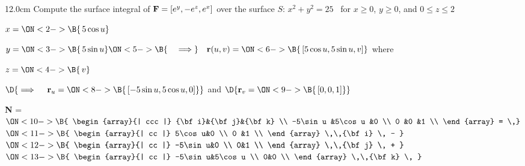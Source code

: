\begin{frame}
\begin{columns}\begin{column}{12.0cm}
\scriptsize
\EX Compute the surface integral of ${\bf F} = [e^y, -e^z, e^x]$ over the surface $S:\, x^2 + y^2 = 25$ \, for $x \ge 0$, $y \ge 0$, and $0 \le z \le 2$

\vspace{0.2cm}

\quad $
x =
\ON<2->{\B{\,5 \cos u}}$

\quad $
y =
\ON<3->{\B{\,5 \sin u}}
\ON<5->{\B{\quad \implies}} \quad {\bf r}(u,v) =
\ON<6->{\B{\, [5\cos u,5 \sin u,v]}}$ \qquad where \quad
{}

\quad $
z =
\ON<4->{\B{\,v}}$

\vspace{0.2cm}
\hspace{1.3cm} $\D{
\implies \quad {\bf r}_u =
\ON<8->{\B{\, [-5\sin u,5\cos u,0]}}}$ \qquad 
and
\qquad $\D{
{\bf r}_v = 
\ON<9->{\B{\,[0,0,1]}}}$

\vspace{0.3cm}

{\bf N} = \,
$\ON<10->{\B{
\begin{array}{| ccc |}
	{\bf i}&{\bf j}&{\bf k} \\
	-5\sin u      &5\cos u     &0 \\
 	0      &0      &1 \\
\end{array}
= \,}}$
$\ON<11->{\B{
\begin{array}{| cc |}
		  5\cos u&0 \\
 		  0 &1 \\
\end{array}
 \,\,{\bf i} \, - }}$\,\,
$\ON<12->{\B{
\begin{array}{| cc |}
		  -5\sin u&0 \\
 		  0&1 \\
\end{array}
 \,\,{\bf j} \, + }}$\,\,
$\ON<13->{\B{
\begin{array}{| cc |}
		  -5\sin u&5\cos u \\
 		  0&0 \\
\end{array}
\,\,{\bf k} \, }}$\\

\vspace{0.3cm}


\end{column}
\end{columns}
\end{frame}
